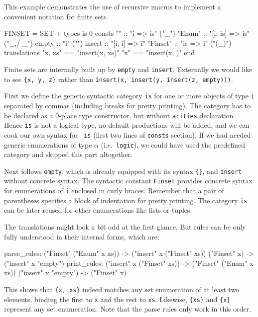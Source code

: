 \begin{example} \label{ex:finset_trans}
This example demonstrates the use of recursive macros to implement a
convenient notation for finite sets.
\begin{ttbox}
FINSET = SET +
types
  is 0
consts
  ""            :: "i => is"                ("_")
  "{\at}Enum"       :: "[i, is] => is"          ("_,/ _")
  empty         :: "i"                      ("{\ttlbrace}{\ttrbrace}")
  insert        :: "[i, i] => i"
  "{\at}Finset"     :: "is => i"                ("{\ttlbrace}(_){\ttrbrace}")
translations
  "{\ttlbrace}x, xs{\ttrbrace}"     == "insert(x, {\ttlbrace}xs{\ttrbrace})"
  "{\ttlbrace}x{\ttrbrace}"         == "insert(x, {\ttlbrace}{\ttrbrace})"
end
\end{ttbox}

Finite sets are internally built up by {\tt empty} and {\tt insert}.
Externally we would like to see \verb|{x, y, z}| rather than {\tt insert(x,
insert(y, insert(z, empty)))}.

First we define the generic syntactic category {\tt is} for one or more
objects of type {\tt i} separated by commas (including breaks for pretty
printing). The category has to be declared as a 0-place type constructor, but
without {\tt arities} declaration. Hence {\tt is} is not a logical type, no
default productions will be added, and we can cook our own syntax for {\tt
is} (first two lines of {\tt consts} section). If we had needed generic
enumerations of type $\alpha$ (i.e.\ {\tt logic}), we could have used the
predefined category  and skipped this part altogether.

Next follows {\tt empty}, which is already equipped with its syntax
\verb|{}|, and {\tt insert} without concrete syntax. The syntactic constant
{\tt\at Finset} provides concrete syntax for enumerations of {\tt i} enclosed
in curly braces. Remember that a pair of parentheses specifies a block of
indentation for pretty printing. The category {\tt is} can be later reused
for other enumerations like lists or tuples.

The translations might look a bit odd at the first glance. But rules can be
only fully understood in their internal forms, which are:
\begin{ttbox}
parse_rules:
  ("{\at}Finset" ("{\at}Enum" x xs))  ->  ("insert" x ("{\at}Finset" xs))
  ("{\at}Finset" x)  ->  ("insert" x "empty")
print_rules:
  ("insert" x ("{\at}Finset" xs))  ->  ("{\at}Finset" ("{\at}Enum" x xs))
  ("insert" x "empty")  ->  ("{\at}Finset" x)
\end{ttbox}
This shows that \verb|{x, xs}| indeed matches any set enumeration of at least
two elements, binding the first to {\tt x} and the rest to {\tt xs}.
Likewise, \verb|{xs}| and \verb|{x}| represent any set enumeration. Note that
the parse rules only work in this order.


\end{example}
